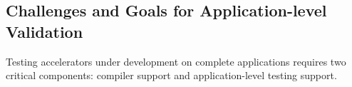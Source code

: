 \subsection{Challenges and Goals for Application-level Validation}
Testing accelerators under development
  on complete applications
  requires two critical components: compiler support and application-level testing support.  

